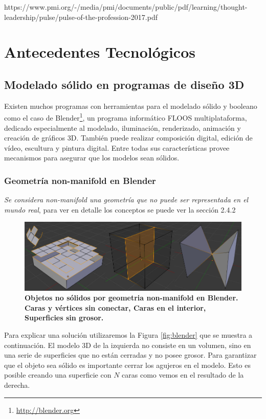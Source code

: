 https://www.pmi.org/-/media/pmi/documents/public/pdf/learning/thought-leadership/pulse/pulse-of-the-profession-2017.pdf


\section{Antecedentes Tecnológicos}

\subsection{Modelado sólido en programas de diseño 3D}
Existen muchos programas con herramientas para el modelado sólido y booleano como el caso de Blender\footnote{\url{http://blender.org}}, un programa informático FLOOS multiplataforma, dedicado especialmente al modelado, iluminación, renderizado, animación y creación de gráficos 3D. También puede realizar composición digital, edición de vídeo, escultura y pintura digital. Entre todas sus características provee mecanismos para asegurar que los modelos sean sólidos.

\subsubsection{Geometría non-manifold en Blender}

\textit{Se considera non-manifold una geometría que no puede ser representada en el mundo real}, para ver en detalle los conceptos se puede ver la sección 2.4.2

\begin{figure}[h]
\includegraphics[width=12cm]{Img/Modelos/modelado20.jpg}
\centering
\caption{\textbf{ \footnotesize{Objetos no sólidos por geometria non-manifold en Blender. Caras y vértices sin conectar, Caras en el interior, Superficies sin grosor.}}}
\end{figure}


Para explicar una solución utilizaremos la Figura \ref{fig:blender} que se muestra a continuación. El modelo 3D de la izquierda no consiste en un volumen, sino en una serie de superficies que no están cerradas y no posee grosor. Para garantizar que el objeto sea sólido es importante cerrar los agujeros en el modelo. Esto es posible creando una superficie con $N$ caras como vemos en el resultado de la derecha.

